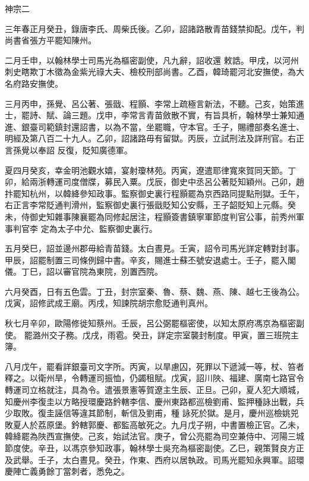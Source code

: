 
\begin{pinyinscope}

 神宗二



 三年春正月癸丑，錄唐李氏、周柴氏後。乙卯，詔諸路散青苗錢禁抑配。戊午，判尚書省張方平罷知陳州。



 二月壬申，以翰林學士司馬光為樞密副使，凡九辭，詔收還
 敕誥。甲戌，以河州刺史瞎欺丁木徵為金紫光祿大夫、檢校刑部尚書。乙酉，韓琦罷河北安撫使，為大名府路安撫使。



 三月丙申，孫覺、呂公著、張戩、程顥、李常上疏極言新法，不聽。己亥，始策進士，罷詩、賦、論三題。戊申，李常言青苗斂散不實，有旨具析，翰林學士兼知通進、銀臺司範鎮封還詔書，以為不當，坐罷職，守本官。壬子，賜禮部奏名進士、明經及第八百二十九人。乙卯，詔諸路毋有留獄。丙辰，立試刑法及詳刑官。右正言孫覺以奉詔
 反復，貶知廣德軍。



 夏四月癸亥，幸金明池觀水嬉，宴射瓊林苑。丙寅，遼遣耶律寬來賀同天節。丁卯，給兩浙轉運司度僧牒，募民入粟。戊辰，御史中丞呂公著貶知穎州。己卯，趙抃罷知杭州，以韓絳參知政事。監察御史裏行程顥罷為京西路同提點刑獄。壬午，右正言李常貶通判滑州，監察御史裏行張戩貶知公安縣，王子韶貶知上元縣。癸未，侍御史知雜事陳襄罷為同修起居注，程顥簽書鎮寧軍節度判官公事，前秀州軍事判官李
 定為太子中允、監察御史裏行。



 五月癸巳，詔並邊州郡毋給青苗錢。太白晝見。壬寅，詔令司馬光詳定轉對封事。甲辰，詔罷制置三司條例歸中書。辛亥，賜進士蘇丕號安退處士。壬子，罷入閣儀。丁巳，詔以審官院為東院，別置西院。



 六月癸酉，日有五色雲。丁丑，封宗室秦、魯、蔡、魏、燕、陳、越七王後為公。戊寅，詔修武成王廟。丙戌，知諫院胡宗愈貶通判真州。



 秋七月辛卯，歐陽修徙知蔡州。壬辰，呂公弼罷樞密使，以知太原府馮京為樞密副使。
 罷潞州交子務。戊戌，雨雹。癸丑，詳定宗室襲封制度。甲寅，置三班院主簿。



 八月戊午，罷看詳銀臺司文字所。丙寅，以旱慮囚，死罪以下遞減一等，杖、笞者釋之。以衛州旱，令轉運司振恤，仍蠲租賦。戊寅，詔川陜、福建、廣南七路官令轉運司立格就注，具為令。遣張景憲等賀遼主生辰、正旦。己卯，夏人犯大順城，知慶州李復圭以方略授環慶路鈐轄李信、慶州東路都巡檢劉甫、監押種詠出戰，兵少取敗。復圭誣信等違其節制，斬信及劉甫，種
 詠死於獄。是月，慶州巡檢姚兕敗夏人於荔原堡。鈐轄郭慶、都監高敏死之。九月戊子朔，中書置檢正官。乙未，韓絳罷為陜西宣撫使。己亥，始試法官。庚子，曾公亮罷為司空兼侍中、河陽三城節度使。辛丑，以馮京參知政事，翰林學士吳充為樞密副使。乙巳，親策賢良方正及武舉。壬子，太白晝見。癸丑，作東、西府以居執政。司馬光罷知永興軍。詔環慶陣亡義勇餘丁當刺者，悉免之。




\end{pinyinscope}
